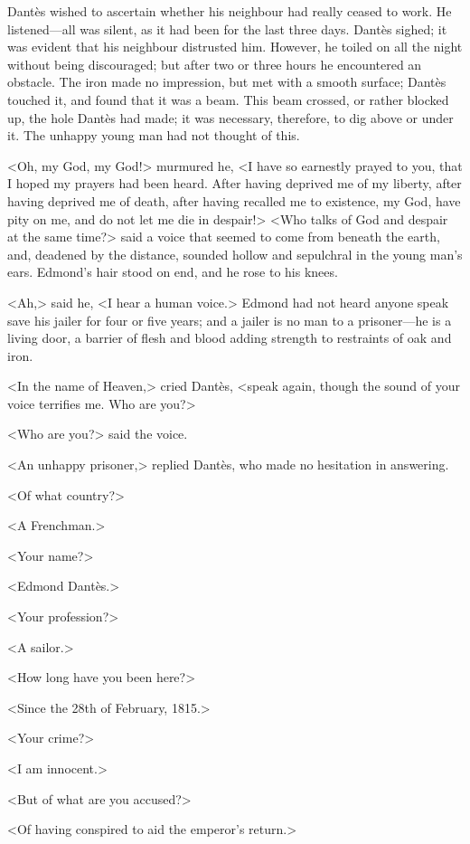  Dantès wished to ascertain whether his neighbour had really ceased to work. He listened—all was silent, as it had been for the last three days. Dantès sighed; it was evident that his neighbour distrusted him. However, he toiled on all the night without being discouraged; but after two or three hours he encountered an obstacle. The iron made no impression, but met with a smooth surface; Dantès touched it, and found that it was a beam. This beam crossed, or rather blocked up, the hole Dantès had made; it was necessary, therefore, to dig above or under it. The unhappy young man had not thought of this. 

 <Oh, my God, my God!> murmured he, <I have so earnestly prayed to you, that I hoped my prayers had been heard. After having deprived me of my liberty, after having deprived me of death, after having recalled me to existence, my God, have pity on me, and do not let me die in despair!>  <Who talks of God and despair at the same time?> said a voice that seemed to come from beneath the earth, and, deadened by the distance, sounded hollow and sepulchral in the young man's ears. Edmond's hair stood on end, and he rose to his knees. 

 <Ah,> said he, <I hear a human voice.> Edmond had not heard anyone speak save his jailer for four or five years; and a jailer is no man to a prisoner—he is a living door, a barrier of flesh and blood adding strength to restraints of oak and iron. 

 <In the name of Heaven,> cried Dantès, <speak again, though the sound of your voice terrifies me. Who are you?> 

 <Who are you?> said the voice. 

 <An unhappy prisoner,> replied Dantès, who made no hesitation in answering. 

 <Of what country?> 

 <A Frenchman.> 

 <Your name?> 

 <Edmond Dantès.> 

 <Your profession?> 

 <A sailor.> 

 <How long have you been here?> 

 <Since the 28th of February, 1815.> 

 <Your crime?> 

 <I am innocent.> 

 <But of what are you accused?> 

 <Of having conspired to aid the emperor's return.> 

